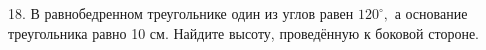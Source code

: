 18. В равнобедренном треугольнике один из углов равен $120^\circ,$ а основание треугольника равно 10 см. Найдите высоту, проведённую к боковой стороне.\\
